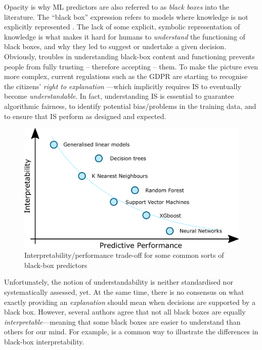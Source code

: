 \documentclass[12pt,a4paper,openright,twoside]{book}
\begin{document}
Opacity is why ML predictors are also referred to as \emph{black boxes} into the literature.
%
The ``black box'' expression refers to models where knowledge is not explicitly represented \cite{Lipton18}.
%
The lack of some explicit, symbolic representation of knowledge is what makes it hard for humans to \emph{understand} the functioning of black boxes, and why they led to suggest or undertake a given decision.
%
Obviously, troubles in understanding black-box content and functioning prevents people from fully trusting -- therefore accepting -- them.
%
To make the picture even more complex, current regulations such as the GDPR \cite{gdpr-voigt2017} are starting to recognise the citizens' \emph{right to explanation} \cite{explanation-aimag38}---which implicitly requires IS to eventually become \emph{understandable}.
%
In fact, understanding IS is essential to guarantee algorithmic fairness, to identify potential bias/problems in the training data, and to ensure that IS perform as designed and expected.

\begin{figure}
    \centering
    \includegraphics[width=\linewidth]{figures/interpretability-performance-tradeoff}
    \caption[Interpretability/performance trade-off]{Interpretability/performance trade-off for some common sorts of black-box predictors}
    \label{fig:tradeoff}
\end{figure}

Unfortunately, the notion of understandability is neither standardised nor systematically assessed, yet.
%
At the same time, there is no consensus on what exactly providing an \emph{explanation} should mean when decisions are supported by a black box.
%
However, several authors agree that not all black boxes are equally \emph{interpretable}---meaning that some black boxes are easier to understand than others for our mind.
%
For example,  is a common way to illustrate the differences in black-box interpretability.
\end{document}
